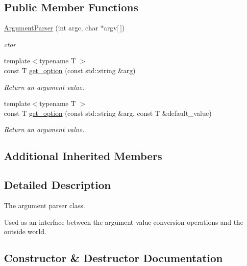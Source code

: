 \subsection*{Public Member Functions}
\begin{DoxyCompactItemize}
\item 
\hyperlink{classcppargparse_1_1parser_1_1ArgumentParser_a8a5e001cdee6650ee537b41678e65130}{Argument\+Parser} (int argc, char $\ast$argv\mbox{[}$\,$\mbox{]})
\begin{DoxyCompactList}\small\item\em c\textquotesingle{}tor \end{DoxyCompactList}\item 
{\footnotesize template$<$typename T $>$ }\\const T \hyperlink{classcppargparse_1_1parser_1_1ArgumentParser_a6aa48f6269d9cad6afb455709b93a50e}{get\+\_\+option} (const std\+::string \&arg)
\begin{DoxyCompactList}\small\item\em Return an argument value. \end{DoxyCompactList}\item 
{\footnotesize template$<$typename T $>$ }\\const T \hyperlink{classcppargparse_1_1parser_1_1ArgumentParser_ace8f1ee0e952ee4aba9b668cfbe48c29}{get\+\_\+option} (const std\+::string \&arg, const T \&default\+\_\+value)
\begin{DoxyCompactList}\small\item\em Return an argument value. \end{DoxyCompactList}\end{DoxyCompactItemize}
\subsection*{Additional Inherited Members}


\subsection{Detailed Description}
The argument parser class. 

Used as an interface between the argument value conversion operations and the outside world. 

\subsection{Constructor \& Destructor Documentation}
\mbox{\label{classcppargparse_1_1parser_1_1ArgumentParser_a8a5e001cdee6650ee537b41678e65130}} 
